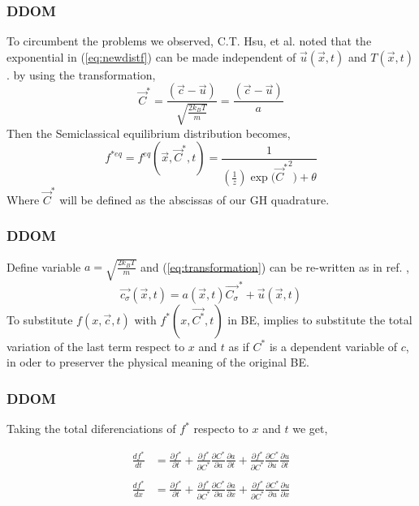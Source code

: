 \documentclass[11pt,fleqn]{beamer}
\begin{document}
\begin{frame}
	\frametitle{DDOM}
	To circumbent the problems we observed, C.T. Hsu, et al. \cite{CTHsu} noted that the exponential in (\ref{eq:newdistf}) can be made independent of $\vec{u}(\vec{x},t)$ and $T(\vec{x},t)$. by using the transformation,
	\begin{equation}
	\vec{C}^{*}  = \frac{(\vec{c}-\vec{u})}{\sqrt{\frac{2 k_B T}{m}}} = \frac{(\vec{c}-\vec{u})}{a}
	\label{eq:transformation}
	\end{equation}
	Then the Semiclassical equilibrium distribution becomes,
	\begin{equation}
	f^{*eq} = f^{eq}(\vec{x},\vec{C}^{*},t) = \frac{1}{(\frac{1}{z})\exp{(\vec{C}^{*}}^2)+\theta}
	\label{eq:newdistf}
	\end{equation}
	Where $\vec{C}^{*}$ will be defined as the abscissas of our GH quadrature.
	
\end{frame}

\begin{frame}
	\frametitle{DDOM}
	Define variable $a = \sqrt{\frac{2 k_B T}{m}}$ and (\ref{eq:transformation}) can be re-written as in ref. \cite{CTHsu},
	\begin{equation}
	\vec{c_\sigma}(\vec{x},t)  = a(\vec{x},t)\vec{C_\sigma}^{*}+\vec{u}(\vec{x},t) 
	\end{equation}
	To substitute $f(x,\vec{c},t)$ with $f^*(x,\vec{C^*},t)$ in BE, implies to substitute the total variation of the last term respect to $x$ and $t$ as if $C^*$ is a dependent variable of $c$, in oder to preserver the physical meaning of the original BE.
\end{frame}

\begin{frame}
	\frametitle{DDOM}
	Taking the total diferenciations of $f^*$ respecto to $x$ and $t$ we get,
			
	\begin{align*}
		\frac{df^*}{dt} &= \frac{\partial{f^*}}{\partial{t}} + 
				\frac{\partial{f^*}}{\partial{C^*}} \frac{\partial{C^*}}{\partial{a}} \frac{\partial{a}}{\partial{t}} + 
				\frac{\partial{f^*}}{\partial{C^*}} \frac{\partial{C^*}}{\partial{u}} \frac{\partial{u}}{\partial{t}}
		\\		
		\\ \frac{df^*}{dx} &= \frac{\partial{f^*}}{\partial{t}} + 
				\frac{\partial{f^*}}{\partial{C^*}} \frac{\partial{C^*}}{\partial{a}} \frac{\partial{a}}{\partial{x}} + 
				\frac{\partial{f^*}}{\partial{C^*}} \frac{\partial{C^*}}{\partial{u}} \frac{\partial{u}}{\partial{x}}
	\end{align*}
\end{frame}
\end{document}
